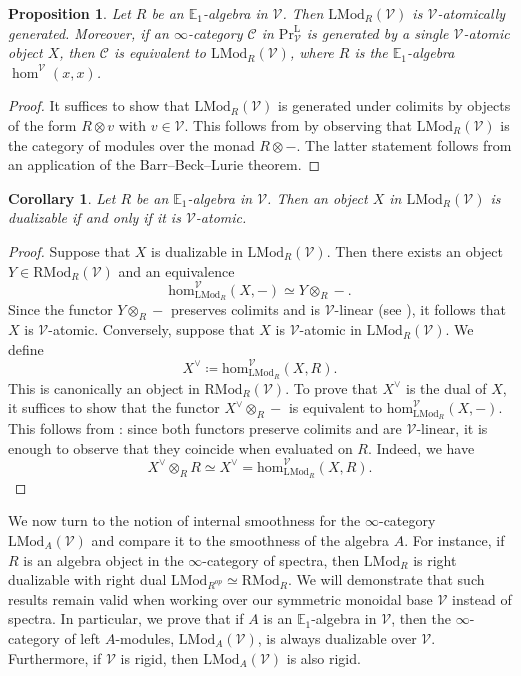 \documentclass[oneside, hidelinks, 12pt, a4paper,reqno]{amsart}
\theoremstyle{plain}
\theoremstyle{definition}
\theoremstyle{plain}
\newtheorem{corollary}[corollary]{Corollary}
\newtheorem{proposition}[proposition]{Proposition}
\newcommand{\cC}{\mathscr C}
\newcommand{\cV}{\mathscr V}
\newcommand{\bbE}{\mathbb E}
\newcommand{\cat}{$\infty$-category }
\newcommand{\RMod}{\mathrm{RMod}}
\newcommand{\LMod}{\mathrm{LMod}}
\newcommand{\LPrV}{\mathrm{Pr}^{\mathrm{L}}_{\cV}}
\begin{document}
\begin{proposition}\label{prop: LModR is molecular}
    Let $R$ be an $\bbE_{1}$-algebra in $\cV$. Then $\LMod_{R}(\cV)$ is $\cV$-atomically generated. Moreover, if an \cat $\cC$ in $\LPrV$ is generated by a single $\cV$-atomic object $X$, then $\cC$ is equivalent to $\LMod_{R}(\cV)$, where $R$ is the $\bbE_{1}$-algebra $\hom^{\cV}(x,x)$.
\end{proposition}
\begin{proof}
    It suffices to show that $\LMod_{R}(\cV)$ is generated under colimits by objects of the form $R\otimes v$ with $v \in \cV$. This follows from \cite[4.7.3.14]{HA} by observing that $\LMod_{R}(\cV)$ is the category of modules over the monad $R\otimes-$. The latter statement follows from an application of the Barr--Beck--Lurie theorem.
\end{proof}

\begin{corollary}\label{cor: dualizable if and only if V-atomic}
    Let $R$ be an $\bbE_{1}$-algebra in $\cV$. Then an object $X$ in $\LMod_{R}(\cV)$ is dualizable if and only if it is $\cV$-atomic.
\end{corollary}
\begin{proof}
    Suppose that $X$ is dualizable in $\LMod_{R}(\cV)$. Then there exists an object $Y \in \RMod_{R}(\cV)$ and an equivalence
    \[
    \mathrm{hom}^{\cV}_{\LMod_{R}}(X,-) \simeq Y \otimes_{R}-.
    \]
    Since the functor $Y\otimes_{R}-$ preserves colimits and is $\cV$-linear (see \cite[4.4.3.14]{HA}), it follows that $X$ is $\cV$-atomic.
    Conversely, suppose that $X$ is $\cV$-atomic in $\LMod_{R}(\cV)$. We define
    \[
    X^{\vee} \coloneqq \mathrm{hom}^{\cV}_{\LMod_{R}}(X,R).
    \]
    This is canonically an object in $\RMod_{R}(\cV)$. To prove that $X^{\vee}$ is the dual of $X$, it suffices to show that the functor $X^{\vee}\otimes_{R}-$ is equivalent to $\mathrm{hom}^{\cV}_{\LMod_{R}}(X,-)$. This follows from : since both functors preserve colimits and are $\cV$-linear, it is enough to observe that they coincide when evaluated on $R$. Indeed, we have
    \[
    X^{\vee}\otimes_{R} R \simeq X^{\vee} = \mathrm{hom}^{\cV}_{\LMod_{R}}(X,R).
    \]
\end{proof}

We now turn to the notion of internal smoothness for the \cat $\LMod_{A}(\cV)$ and compare it to the smoothness of the algebra $A$. For instance, if $R$ is an algebra object in the \cat of spectra, then $\LMod_{R}$ is right dualizable with right dual $\LMod_{R^{op}}\simeq \RMod_{R}$. We will demonstrate that such results remain valid when working over our symmetric monoidal base $\cV$ instead of spectra. In particular, we prove that if $A$ is an $\bbE_{1}$-algebra in $\cV$, then the \cat of left $A$-modules, $\LMod_{A}(\cV)$, is always dualizable over $\cV$. Furthermore, if $\cV$ is rigid, then $\LMod_{A}(\cV)$ is also rigid.
\end{document}
